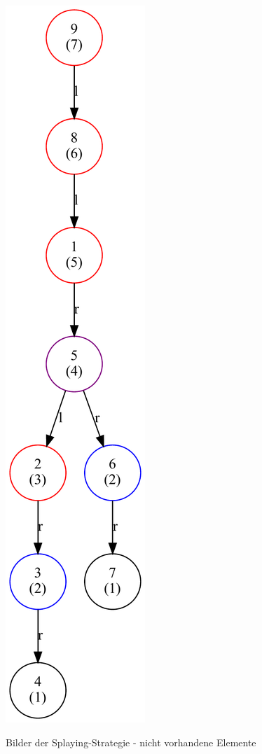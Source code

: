 \begin{figure}[hbt]
{        \includegraphics[scale = 0.32]{img/gv/aufg2_6_FindBT99}\label{fig:splay-findbt99}}
    \caption{Bilder der Splaying-Strategie - nicht vorhandene Elemente}\label{fig:splay2}
\end{figure}
